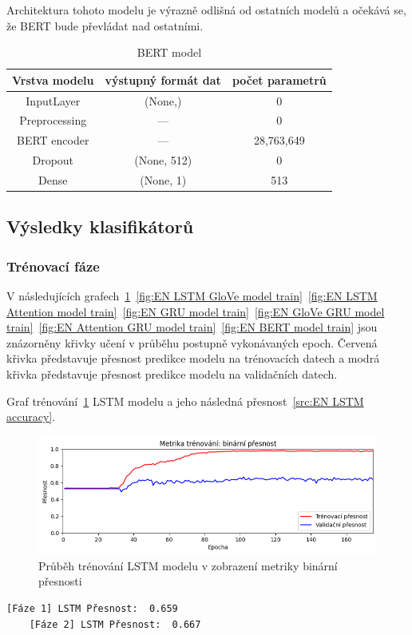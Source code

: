Architektura tohoto modelu je výrazně odlišná od ostatních modelů a očekává se, že BERT bude převládat nad ostatními.

\begin{table}[H]
	\centering
	\caption{BERT model}\label{tab:BERT model}
	\begin{tabular}{ c c c }
			\toprule
			Vrstva modelu & výstupný formát dat & počet parametrů\\
			\midrule
            InputLayer & (None,) & 0\\         
            Preprocessing & --- & 0\\   
            BERT encoder & --- & 28,763,649\\    
            Dropout & (None, 512) & 0\\  
            Dense & (None, 1) & 513\\ 
			\midrule
		\end{tabular}
\end{table}

\subsection{Výsledky klasifikátorů}
\subsubsection{Trénovací fáze}
V následujících grafech~\ref{fig:EN LSTM model train}~\ref{fig:EN LSTM GloVe model train}~\ref{fig:EN LSTM Attention model train}~\ref{fig:EN GRU model train}~\ref{fig:EN GloVe GRU model train}~\ref{fig:EN Attention GRU model train}~\ref{fig:EN BERT model train} jsou znázorněny křivky učení v průběhu postupně vykonávaných epoch.
Červená křivka představuje přesnost predikce modelu na trénovacích datech a modrá křivka představuje přesnost predikce modelu na validačních datech.

Graf trénování~\ref{fig:EN LSTM model train} LSTM modelu a jeho následná přesnost~\ref{src:EN LSTM accuracy}.
\begin{figure}[H]
	\centering
	\includegraphics[width=1\textwidth]{Figures/EN_LSTM_binarni_presnost.png}
	\caption{Průběh trénování LSTM modelu v zobrazení metriky binární přesnosti}\label{fig:EN LSTM model train}
\end{figure}
\begin{lstlisting}[label=src:EN LSTM accuracy, caption={Výsledek LSTM modelu na anglickém datasetu po trénování~\ref{fig:EN LSTM model train}}]
	[Fáze 1] LSTM Přesnost:  0.659
	[Fáze 2] LSTM Přesnost:  0.667
\end{lstlisting}

